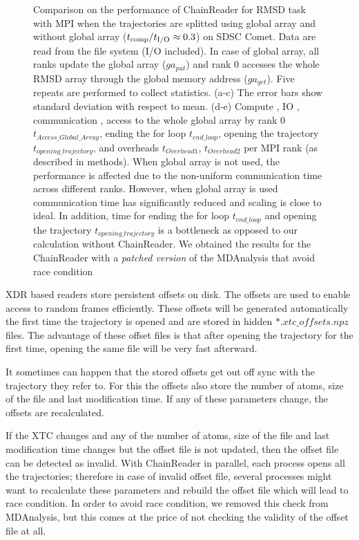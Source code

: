 \begin{figure}[ht!]
\caption{Comparison on the performance of ChainReader for RMSD task with MPI when the trajectories are splitted using global array and without global array (${t}_{\text{comp}}/{t}_{\text{I/O}} \approx 0.3$) on SDSC Comet.
Data are read from the file system (I/O included). In case of global array, all ranks update the global array ($ga_{put}$) and rank 0 accesses the whole RMSD array through the global memory address ($ga_{get}$).
Five repeats are performed to collect statistics. (a-c) The error bars show standard deviation with respect to mean. 
(d-e) Compute \tcomp, IO \tIO, communication \tcomm, access to the whole global array by rank 0 $t_{Access\_Global\_Array}$, ending the for loop $t_{end\_loop}$, 
opening the trajectory $t_{opening\_trajectory}$, and overheads $t_{Overhead1}$, $t_{Overhead2}$ per MPI rank (as described in methods). When global array is not used, the performance is affected due to the non-uniform
communication time across different ranks. However, when global array is used communication time has significantly reduced and scaling is close to ideal. In addition, time for ending the for loop $t_{end\_loop}$ and 
opening the trajectory $t_{opening\_trajectory}$ is a bottleneck as opposed to our calculation without ChainReader. We obtained the results for the ChainReader with a \emph{patched version} of the MDAnalysis that avoid race condition}
\label{fig:MPIwithIO-split-chain-reader}
\end{figure}

XDR based readers store persistent offsets on disk. 
The offsets are used to enable access to random frames efficiently. 
These offsets will be generated automatically the first time the trajectory is opened and are stored in hidden $\ast.xtc\_offsets.npz$ files. 
The advantage of these offset files is that after opening the trajectory for the first time, opening the same file will be very fast afterward. 

It sometimes can happen that the stored offsets get out off sync with the trajectory they refer to. 
For this the offsets also store the number of atoms, size of the file and last modification time. 
If any of these parameters change, the offsets are recalculated. 
 
If the XTC changes and any of the number of atoms, size of the file and last modification time changes but the offset file is not updated, then the offset file can be detected as invalid.
With ChainReader in parallel, each process opens all the trajectories; therefore in case of invalid offset file, several processes might want to recalculate these parameters and rebuild the offset file which will lead to race condition.
In order to avoid race condition, we removed this check from MDAnalysis, but this comes at the price of not checking the validity of the offset file at all.
 
